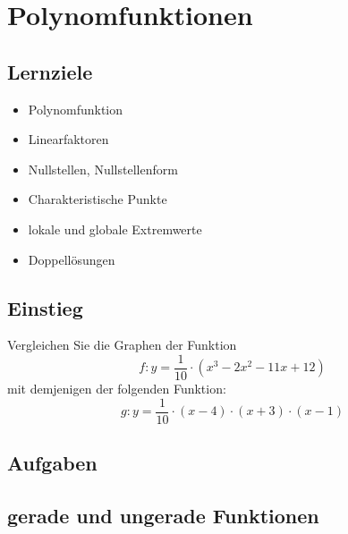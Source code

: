 
\section{Polynomfunktionen}

\subsection*{Lernziele}

\begin{itemize}
\item Polynomfunktion
\item Linearfaktoren
\item Nullstellen, Nullstellenform
\item Charakteristische Punkte
\item lokale und globale Extremwerte
\item Doppellösungen
\end{itemize}

\newpage


\subsection{Einstieg}
Vergleichen Sie die Graphen der Funktion
$$f: y= \frac1{10}\cdot{}(x^3-2x^2-11x+12)$$
mit demjenigen der folgenden Funktion:
$$g: y=\frac1{10}\cdot{}(x-4)\cdot{}(x+3)\cdot{}(x-1)$$



\subsection*{Aufgaben}



\newpage



\subsection{gerade und ungerade Funktionen}


